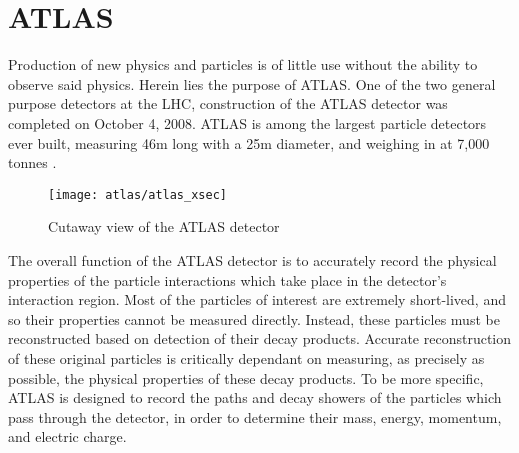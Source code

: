 



\chapter{ATLAS} 
    Production of new physics and particles is of little use without the ability to observe said physics.
    Herein lies the purpose of ATLAS.
    One of the two general purpose detectors at the LHC, construction of the ATLAS detector was completed on October 4, 2008.
    ATLAS is among the largest particle detectors ever built, measuring 46m long with a 25m diameter, and weighing in at 7,000 tonnes \cite{atlas_website}.

    \begin{figure}[h]
        \texttt{[image: atlas/atlas\_xsec]}
        \caption{Cutaway view of the ATLAS detector \cite{Pequenao:1095924}}
        \label{fig:atlas_xsec}
    \end{figure}


    The overall function of the ATLAS detector is to accurately record the physical properties of the particle interactions which take place in the detector's interaction region.
    Most of the particles of interest are extremely short-lived, and so their properties cannot be measured directly.
    Instead, these particles must be reconstructed based on detection of their decay products.
    Accurate reconstruction of these original particles is critically dependant on measuring, as precisely as possible, the physical properties of these decay products.
    To be more specific, ATLAS is designed to record the paths and decay showers of the particles which pass through the detector, in order to determine their mass, energy, momentum, and electric charge.

